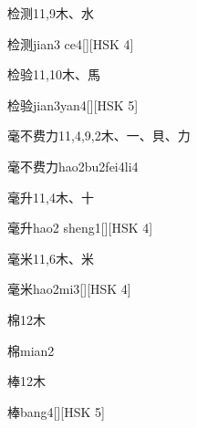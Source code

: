 \begin{entry}{检测}{11,9}{⽊、⽔}
  \begin{phonetics}{检测}{jian3 ce4}[][HSK 4]
  \end{phonetics}
\end{entry}

\begin{entry}{检验}{11,10}{⽊、⾺}
  \begin{phonetics}{检验}{jian3yan4}[][HSK 5]
  \end{phonetics}
\end{entry}

\begin{entry}{毫不费力}{11,4,9,2}{⽊、⼀、⾙、⼒}
  \begin{phonetics}{毫不费力}{hao2bu2fei4li4}
  \end{phonetics}
\end{entry}

\begin{entry}{毫升}{11,4}{⽊、⼗}
  \begin{phonetics}{毫升}{hao2 sheng1}[][HSK 4]
  \end{phonetics}
\end{entry}

\begin{entry}{毫米}{11,6}{⽊、⽶}
  \begin{phonetics}{毫米}{hao2mi3}[][HSK 4]
  \end{phonetics}
\end{entry}

\begin{entry}{棉}{12}{⽊}
  \begin{phonetics}{棉}{mian2}
  \end{phonetics}
\end{entry}

\begin{entry}{棒}{12}{⽊}
  \begin{phonetics}{棒}{bang4}[][HSK 5]
  \end{phonetics}
\end{entry}


